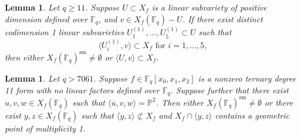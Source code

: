 \documentclass{amsart}
\newcommand{\F}{\mathbb{F}}
\renewcommand{\P}{\mathbb{P}}
\newcommand{\Span}[1]{\langle #1 \rangle}
\newcommand{\sm}{\mathrm{sm}}
\newtheorem{lemma}[theorem]{Lemma}
\theoremstyle{definition}
\numberwithin{equation}{section}
\numberwithin{table}{section}
\newcommand{\qbound}[1]{{\color{cyan}$q > {#1}$}}
\newcommand{\qboundgeq}[1]{{\color{cyan}$q \geq {#1}$}}
\renewcommand{\qbound}[1]{{$q > {#1}$}}
\renewcommand{\qboundgeq}[1]{{$q \geq {#1}$}}
\begin{document}
\begin{lemma}
\label{lem:11.3}
    Let \qboundgeq{11}. Suppose $U \subset X_f$ is a linear subvariety of positive dimension defined over $\F_q$, and $v \in X_f(\F_q) - U$. If there exist distinct codimension 1 linear subvarieties $U_1^{(1)}, \ldots, U_5^{(1)} \subset U$ such that
    \[\Span{U_i^{(1)}, v} \subset X_f \text{ for } i =1,\ldots,5,\]
    then either $X_f(\F_q)^{\sm} \neq \emptyset$ or $\Span{U,v} \subset X_f$.
\end{lemma}

\begin{lemma}
\label{lem:plane_with_3pts_d=11}
    Let \qbound{7061}. Suppose $f \in \F_q[x_0, x_1, x_2]$ is a nonzero ternary degree 11 form with no linear factors defined over $\F_q$. Suppose further that there exist $u,v,w \in X_f(\F_q)$ such that $\Span{u,v,w} = \P^2$. Then either $X_f(\F_q)^{\sm} \neq \emptyset$ or there exist $y,z \in X_f(\F_q)$ such that $\Span{y,z} \not\subset X_f$ and $X_f \cap \Span{y,z}$ contains a geometric point of multiplicity 1.
\end{lemma}
\end{document}
